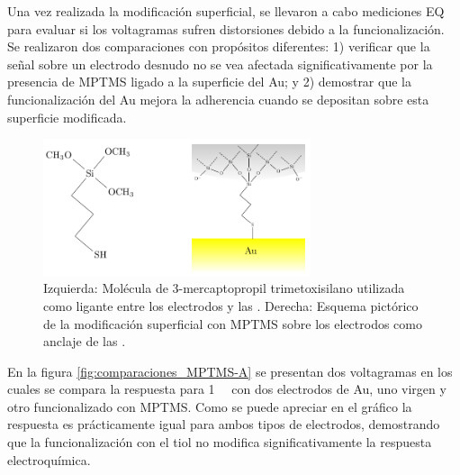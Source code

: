 			 Una vez realizada la modificación superficial, se llevaron a cabo mediciones EQ para evaluar si los voltagramas sufren distorsiones debido a la funcionalización. Se realizaron dos comparaciones con propósitos diferentes: 1) verificar que la señal sobre un electrodo desnudo no se vea afectada significativamente por la presencia de MPTMS ligado a la superficie del Au; y 2) demostrar que la funcionalización del Au mejora la adherencia cuando se depositan \pdm\space sobre esta superficie modificada.

			 \begin{figure}[!ht]
							\begin{center}
							\includegraphics[width=0.70\textwidth]{Esquemas/mod_sup.pdf}
							\caption[Modificación superficial de los electrodos.]{Izquierda: Molécula de  3-mercaptopropil trimetoxisilano utilizada como ligante entre los electrodos y las \pdm. Derecha: Esquema pictórico de la modificación superficial con MPTMS sobre los electrodos como anclaje de las \pdm.}
							\label{fig:mod_sup}
							\end{center}
							\end{figure}
										
			 En la figura \ref{fig:comparaciones_MPTMS-A} se presentan dos voltagramas en los cuales se compara la respuesta para \aminorutenio\space \SI{1}{\milli\Molar} con dos electrodos de Au, uno virgen y otro funcionalizado con MPTMS. Como se puede apreciar en el gráfico la respuesta es prácticamente igual para ambos tipos de electrodos, demostrando que la funcionalización con el tiol no modifica significativamente la respuesta electroquímica.

